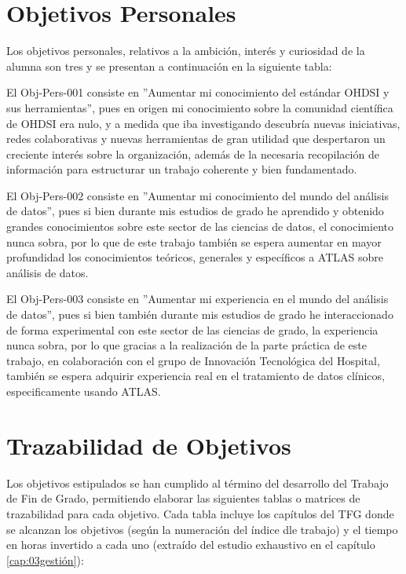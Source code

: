 \section{Objetivos Personales} \label{sec:02objPersonal}

Los objetivos personales, relativos a la ambición, interés y curiosidad de la alumna son tres y se presentan a continuación en la siguiente tabla:



El Obj-Pers-001 consiste en ''Aumentar mi conocimiento del estándar OHDSI y sus herramientas'', pues en origen mi conocimiento sobre la comunidad científica de OHDSI era nulo, y a medida que iba investigando descubría nuevas iniciativas, redes colaborativas y nuevas herramientas de gran utilidad que despertaron un creciente interés sobre la organización, además de la necesaria recopilación de información para estructurar un trabajo coherente y bien fundamentado.

El Obj-Pers-002 consiste en ''Aumentar mi conocimiento del mundo del análisis de datos'', pues si bien durante mis estudios de grado he aprendido y obtenido grandes conocimientos sobre este sector de las ciencias de datos, el conocimiento nunca sobra, por lo que de este trabajo también se espera aumentar en mayor profundidad los conocimientos teóricos, generales y específicos a ATLAS sobre análisis de datos.

El Obj-Pers-003 consiste en ''Aumentar mi experiencia en el mundo del análisis de datos'', pues si bien también durante mis estudios de grado he interaccionado de forma experimental con este sector de las ciencias de grado, la experiencia nunca sobra, por lo que gracias a la realización de la parte práctica de este trabajo, en colaboración con el grupo de Innovación Tecnológica del Hospital, también se espera adquirir experiencia real en el tratamiento de datos clínicos, especificamente usando ATLAS.

\section{Trazabilidad de Objetivos} \label{sec:02trazabilidad}

Los objetivos estipulados se han cumplido al término del desarrollo del Trabajo de Fin de Grado, permitiendo elaborar las siguientes tablas o matrices de trazabilidad para cada objetivo. Cada tabla incluye los capítulos del TFG donde se alcanzan los objetivos (según la numeración del índice dle trabajo) y el tiempo en horas invertido a cada uno (extraído del estudio exhaustivo en el capítulo \ref{cap:03gestión}):

